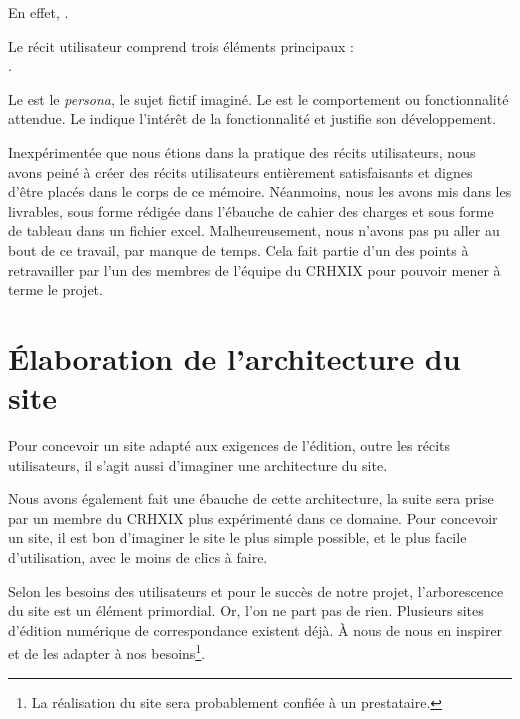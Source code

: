 En effet, .

Le récit utilisateur comprend trois éléments principaux : \\
.

Le  est le \emph{persona}, le sujet fictif imaginé. Le  est le comportement ou fonctionnalité attendue. Le  indique l'intérêt de la fonctionnalité et justifie son développement. 

Inexpérimentée que nous étions dans la pratique des récits utilisateurs, nous avons peiné à créer des récits utilisateurs entièrement satisfaisants et dignes d'être placés dans le corps de ce mémoire. Néanmoins, nous les avons mis dans les livrables, sous forme rédigée dans l'ébauche de cahier des charges et sous forme de tableau dans un fichier excel. Malheureusement, nous n'avons pas pu aller au bout de ce travail, par manque de temps. Cela fait partie d'un des points à retravailler par l'un des membres de l'équipe du CRHXIX pour pouvoir mener à terme le projet.  
	
\section{Élaboration de l'architecture du site}
	
Pour concevoir un site adapté aux exigences de l'édition, outre les récits utilisateurs, il s'agit aussi d'imaginer une architecture du site.

Nous avons également fait une ébauche de cette architecture, la suite sera prise par un membre du CRHXIX plus expérimenté dans ce domaine.
Pour concevoir un site, il est bon d'imaginer le site le plus simple possible, et le plus facile d'utilisation, avec le moins de clics à faire.

Selon les besoins des utilisateurs et pour le succès de notre projet, l’arborescence du site est un élément primordial. Or, l’on ne part pas de rien. Plusieurs sites d’édition numérique de correspondance existent déjà. À nous de nous en inspirer et de les adapter à nos besoins\footnote{La réalisation du site sera probablement confiée à un prestataire.}. 

